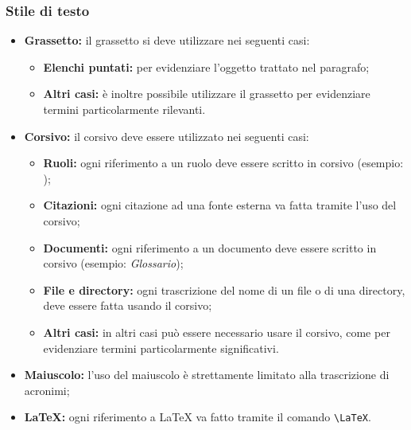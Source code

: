 \subsubsection{Stile di testo}
\label{stile}
\begin{itemize}
\item \textbf{Grassetto:} il grassetto si deve utilizzare nei seguenti casi:
\begin{itemize}
\item \textbf{Elenchi puntati:} per evidenziare l'oggetto trattato nel paragrafo;
\item \textbf{Altri casi:} è inoltre possibile utilizzare il grassetto per evidenziare termini particolarmente rilevanti. 
\end{itemize}
\item \textbf{Corsivo:} il corsivo deve essere utilizzato nei seguenti casi:
\begin{itemize}
\item \textbf{Ruoli:} ogni riferimento a un ruolo deve essere scritto in corsivo (esempio: \projectManager);
\item \textbf{Citazioni:} ogni citazione ad una fonte esterna va fatta tramite l'uso del corsivo;
\item \textbf{Documenti:} ogni riferimento a un documento deve essere scritto in corsivo (esempio: \emph{Glossario});
\item\textbf{File e directory:} ogni trascrizione del nome di un file o di una directory, deve essere fatta usando il corsivo; 
\item \textbf{Altri casi:} in altri casi può essere necessario usare il corsivo, come per evidenziare termini particolarmente significativi.
\end{itemize}
\item \textbf{Maiuscolo:} l'uso del maiuscolo è strettamente limitato alla trascrizione di acronimi;
\item \textbf{\LaTeX{}:} ogni riferimento a \LaTeX{} va fatto tramite il comando \verb!\LaTeX!.
\end{itemize}


